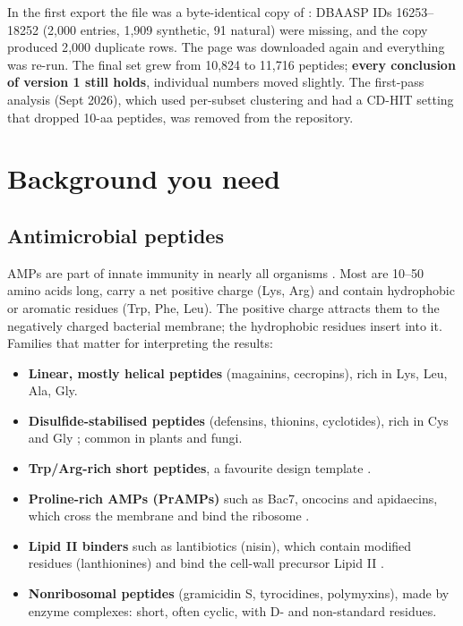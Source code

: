 \documentclass[11pt,a4paper]{article}
\begin{document}
\begin{keypoint}
In the first export the file  was a byte-identical copy of : DBAASP IDs 16253--18252 (2{,}000 entries,
1{,}909 synthetic, 91 natural) were missing, and the copy produced 2{,}000 duplicate rows. The page was downloaded again and everything was re-run.
The final set grew from 10{,}824 to 11{,}716 peptides; \textbf{every conclusion of version 1 still holds}, individual numbers moved slightly.
The first-pass analysis (Sept 2026), which used per-subset clustering and had a CD-HIT setting that dropped 10-aa peptides, was removed from the repository.
\end{keypoint}

\section{Background you need}

\subsection{Antimicrobial peptides}
AMPs are part of innate immunity in nearly all organisms \cite{zasloff2002,hancock2006}. Most are 10--50 amino acids long, carry a net positive charge (Lys, Arg)
and contain hydrophobic or aromatic residues (Trp, Phe, Leu). The positive charge attracts them to the negatively charged bacterial membrane; the hydrophobic residues
insert into it. Families that matter for interpreting the results:
\begin{itemize}
\item \textbf{Linear, mostly helical peptides} (magainins, cecropins), rich in Lys, Leu, Ala, Gly.
\item \textbf{Disulfide-stabilised peptides} (defensins, thionins, cyclotides), rich in Cys and Gly \cite{ganz2003}; common in plants and fungi.
\item \textbf{Trp/Arg-rich short peptides}, a favourite design template \cite{chan2006}.
\item \textbf{Proline-rich AMPs (PrAMPs)} such as Bac7, oncocins and apidaecins, which cross the membrane and bind the ribosome \cite{graf2017}.
\item \textbf{Lipid II binders} such as lantibiotics (nisin), which contain modified residues (lanthionines) and bind the cell-wall precursor Lipid II \cite{breukink2006}.
\item \textbf{Nonribosomal peptides} (gramicidin S, tyrocidines, polymyxins), made by enzyme complexes: short, often cyclic, with D- and non-standard residues.
\end{itemize}
\end{document}
